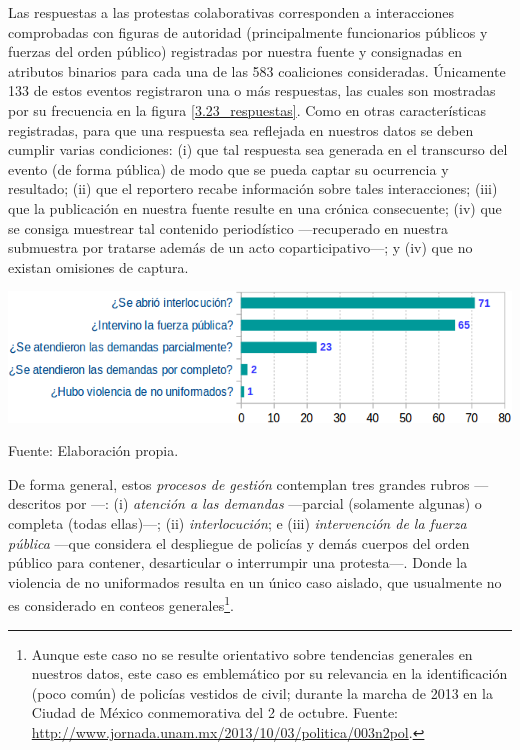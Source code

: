 \documentclass[letterpaper, 11pt]{book}
\theoremstyle{definition}
\theoremstyle{remark}
\begin{document}
Las respuestas a las protestas colaborativas corresponden a interacciones comprobadas con figuras de autoridad (principalmente funcionarios públicos y fuerzas del orden público) registradas por nuestra fuente y consignadas en atributos binarios para cada una de las 583 coaliciones consideradas. 
Únicamente 133 de estos eventos registraron una o más respuestas, las cuales son mostradas por su frecuencia en la figura \ref{3.23_respuestas}. 
Como en otras características registradas, para que una respuesta sea reflejada en nuestros datos se deben cumplir varias condiciones: 
(i) que tal respuesta sea generada en el transcurso del evento (de forma pública) de modo que se pueda captar su ocurrencia y resultado; 
(ii) que el reportero recabe información sobre tales interacciones; 
(iii) que la publicación en nuestra fuente resulte en una crónica consecuente; 
(iv) que se consiga muestrear tal contenido periodístico ---recuperado en nuestra submuestra por tratarse además de un acto coparticipativo---; 
y (iv) que no existan omisiones de captura. 

\hspace{-1em}\begin{minipage}{\linewidth}
\centering
{} \label{3.23_respuestas}
\includegraphics[scale=0.55]{img/3.23_respuestas.png}
\par\bigskip
\small Fuente: Elaboración propia.
\end{minipage}\bigskip

De forma general, estos \emph{procesos de gestión} contemplan tres grandes rubros ---descritos por \citet{2017_Rob_Respuestas}---: 
(i) \emph{atención a las demandas} ---parcial (solamente algunas) o completa (todas ellas)---; 
(ii) \emph{interlocución}; 
e (iii) \emph{intervención de la fuerza pública} ---que considera el despliegue de policías y demás cuerpos del orden público para contener, desarticular o interrumpir una protesta---.
Donde la violencia de no uniformados resulta en un único caso aislado, que usualmente no es considerado en conteos generales\footnote{
    Aunque este caso no se resulte orientativo sobre tendencias generales en nuestros datos, este caso es emblemático por su relevancia en la identificación (poco común) de policías vestidos de civil; durante la marcha de 2013 en la Ciudad de México conmemorativa del 2 de octubre. Fuente: \url{http://www.jornada.unam.mx/2013/10/03/politica/003n2pol}.
}. 
\end{document}

